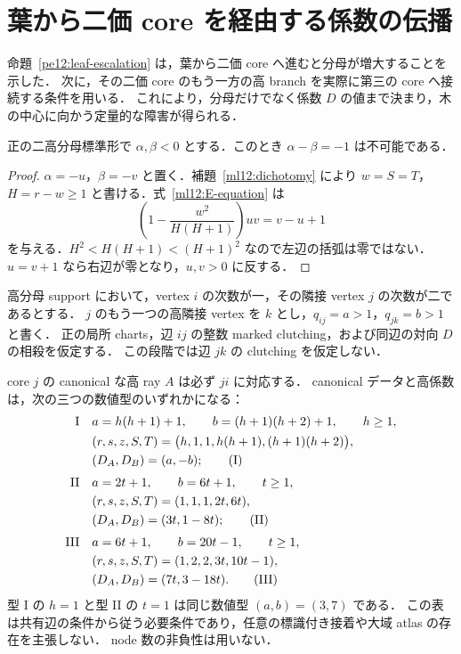 
\section{葉から二価 core を経由する係数の伝播}
\label{lt13:section}

命題~\ref{pe12:leaf-escalation} は，葉から二価 core へ進むと分母が増大することを示した．
次に，その二価 core のもう一方の高 branch を実際に第三の core へ接続する条件を用いる．
これにより，分母だけでなく係数 $D$ の値まで決まり，木の中心に向かう定量的な障害が得られる．

\begin{lemma}
\label{lt13:no-negative-unit-gap}
正の二高分母標準形で $\alpha,\beta<0$ とする．このとき $\alpha-\beta=-1$ は不可能である．
\end{lemma}

\begin{proof}
$\alpha=-u$，$\beta=-v$ と置く．補題~\ref{ml12:dichotomy} により
$w=S=T$，$H=r-w\geq1$ と書ける．式~\eqref{ml12:E-equation} は
\[
 \left(1-\frac{w^2}{H(H+1)}\right)uv=v-u+1
\]
を与える．$H^2<H(H+1)<(H+1)^2$ なので左辺の括弧は零ではない．
$u=v+1$ なら右辺が零となり，$u,v>0$ に反する．
\end{proof}

\begin{proposition}[葉に接続した二高分母模型の三つの数値型]
\label{lt13:three-types}
高分母 support において，vertex $i$ の次数が一，その隣接 vertex $j$ の次数が二であるとする．
$j$ のもう一つの高隣接 vertex を $k$ とし，$q_{ij}=a>1$，$q_{jk}=b>1$ と書く．
正の局所 charts，辺 $ij$ の整数 marked clutching，および同辺の対向 $D$ の相殺を仮定する．
この段階では辺 $jk$ の clutching を仮定しない．

core $j$ の canonical な高 ray $A$ は必ず $ji$ に対応する．
canonical データと高係数は，次の三つの数値型のいずれかになる：
\begin{align*}
\textnormal{I}\quad
 &a=h(h+1)+1,\qquad b=(h+1)(h+2)+1,\qquad h\geq1,\\
 &(r,s,z,S,T)=\bigl(h,1,1,h(h+1),(h+1)(h+2)\bigr),\\
 &(D_A,D_B)=(a,-b);\tag{I}\label{lt13:type-I}\\[1mm]
\textnormal{II}\quad
 &a=2t+1,\qquad b=6t+1,\qquad t\geq1,\\
 &(r,s,z,S,T)=(1,1,1,2t,6t),\\
 &(D_A,D_B)=(3t,1-8t);\tag{II}\label{lt13:type-II}\\[1mm]
\textnormal{III}\quad
 &a=6t+1,\qquad b=20t-1,\qquad t\geq1,\\
 &(r,s,z,S,T)=(1,2,2,3t,10t-1),\\
 &(D_A,D_B)=(7t,3-18t).\tag{III}\label{lt13:type-III}
\end{align*}
型 I の $h=1$ と型 II の $t=1$ は同じ数値型 $(a,b)=(3,7)$ である．
この表は共有辺の条件から従う必要条件であり，任意の標識付き接着や大域 atlas の存在を主張しない．
node 数の非負性は用いない．
\end{proposition}

